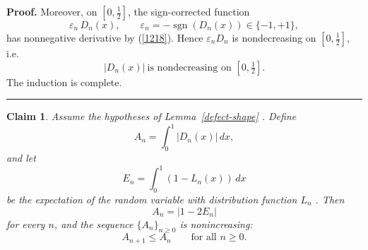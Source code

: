 \documentclass[onecolumn]{article}
\providecommand{\func}[1]{\operatorname{#1}}
\newtheorem{claim}[theorem]{Claim}
\newenvironment{proof}[1][Proof]{\noindent\textbf{#1.} }{\ \rule{0.5em}{0.5em}}
\begin{document}
\begin{proof}
Moreover, on $[0,\tfrac{1}{2}]$, the sign-corrected function 
\begin{equation}
\varepsilon _{n}\,D_{n}(x),\qquad \varepsilon _{n}=-\func{sgn}(D_{n}(x))\in
\{-1,+1\},  \label{1221}
\end{equation}%
has nonnegative derivative by (\ref{1218}). Hence $\varepsilon _{n}D_{n}$ is
nondecreasing on $[0,\tfrac{1}{2}]$, i.e. 
\begin{equation}
|D_{n}(x)|\ \text{is nondecreasing on }[0,\tfrac{1}{2}].  \label{1222}
\end{equation}%
The induction is complete. \hfill
\end{proof}

\begin{claim}
\label{An-monotone} Assume the hypotheses of \textit{Lemma~\ref{defect-shape}%
}. Define 
\begin{equation}
A_{n}=\int_{0}^{1}|D_{n}(x)|\,dx,  \label{1223}
\end{equation}%
and let 
\begin{equation}
E_{n}=\int_{0}^{1}(1-L_{n}(x))\,dx  \label{1224}
\end{equation}%
be the expectation of the random variable with distribution function $L_{n}$%
. Then 
\begin{equation}
A_{n}=|1-2E_{n}|  \label{1225}
\end{equation}%
for every $n$, and the sequence $\{A_{n}\}_{n\geq 0}$ is nonincreasing: 
\begin{equation}
A_{n+1}\leq A_{n}\qquad \text{for all }n\geq 0.  \label{1226}
\end{equation}
\end{claim}
\end{document}
